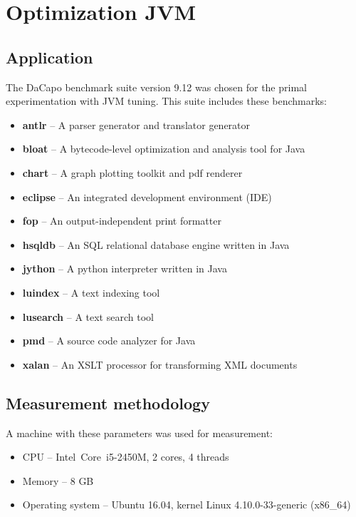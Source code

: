 \documentclass[
  digital, %
  oneside,
  notable, %
  nolof,     %
  nolot     %
]{fithesis3}
\begin{document}




\chapter{Optimization JVM}

\section{Application}
The DaCapo benchmark suite version 9.12 was chosen for the primal experimentation with JVM tuning. This suite includes these benchmarks: \cite{DaCapo:paper}
\begin{itemize}
	\item \textbf{antlr} -- A parser generator and translator generator
	\item \textbf{bloat} -- A bytecode-level optimization and analysis tool for Java
	\item \textbf{chart} -- A graph plotting toolkit and pdf renderer
	\item \textbf{eclipse} -- An integrated development environment (IDE)
	\item \textbf{fop} -- An output-independent print formatter
	\item \textbf{hsqldb} -- An SQL relational database engine written in Java
	\item \textbf{jython} -- A python interpreter written in Java
	\item \textbf{luindex} -- A text indexing tool
	\item \textbf{lusearch} -- A text search tool
	\item \textbf{pmd} -- A source code analyzer for Java
	\item \textbf{xalan} -- An XSLT processor for transforming XML documents
\end{itemize}
\section{Measurement methodology}
A machine with these parameters was used for measurement:
\begin{itemize}
	\item CPU -- Intel\textregistered\ Core\texttrademark\ i5-2450M, 2 cores, 4 threads
	\item Memory -- 8 GB
	\item Operating system -- Ubuntu 16.04, kernel Linux 4.10.0-33-generic (x86\_64)
\end{itemize}
\end{document}
